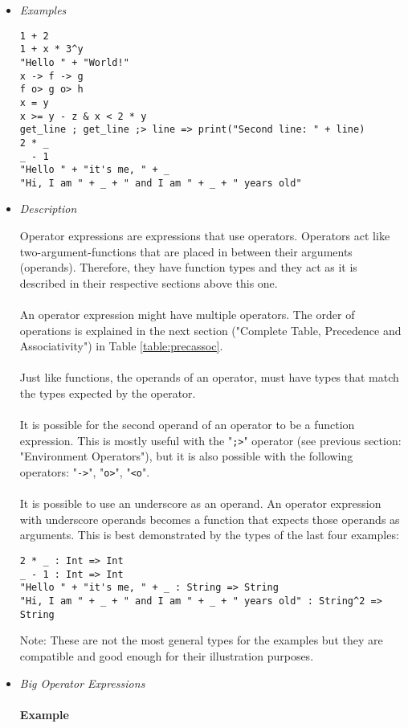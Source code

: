 \documentclass{article}
\begin{document}
\begin{itemize}
\item \textit{Examples}
\begin{verbatim}
1 + 2
1 + x * 3^y
"Hello " + "World!"
x -> f -> g
f o> g o> h
x = y
x >= y - z & x < 2 * y
get_line ; get_line ;> line => print("Second line: " + line)
2 * _
_ - 1
"Hello " + "it's me, " + _ 
"Hi, I am " + _ + " and I am " + _ + " years old"
\end{verbatim}

\item \textit{Description}

Operator expressions are expressions that use operators. Operators act like
two-argument-functions that are placed in between their arguments (operands).
Therefore, they have function types and they act as it is described in their
respective sections above this one.
\\\\
An operator expression might have multiple operators. The order of operations
is explained in the next section ("Complete Table, Precedence and Associativity")
in Table \ref{table:precassoc}.
\\\\
Just like functions, the operands of an operator, must have types that match
the types expected by the operator.
\\\\
It is possible for the second operand of an operator to be a function expression.
This is mostly useful with the "\texttt{;>}" operator (see previous section:
"Environment Operators"), but it is also possible with the following operators:
"\texttt{->}", "\texttt{o>}", "\texttt{<o}".
\\\\
It is possible to use an underscore as an operand. An operator expression with 
underscore operands becomes a function that expects those operands as arguments.
This is best demonstrated by the types of the last four examples: 

\begin{verbatim}
2 * _ : Int => Int
_ - 1 : Int => Int
"Hello " + "it's me, " + _ : String => String
"Hi, I am " + _ + " and I am " + _ + " years old" : String^2 => String
\end{verbatim}
Note: These are not the most general types for the examples but they are compatible
and good enough for their illustration purposes.

\item \textit{Big Operator Expressions}\\\\
\textbf{Example}


\end{itemize}
\end{document}
